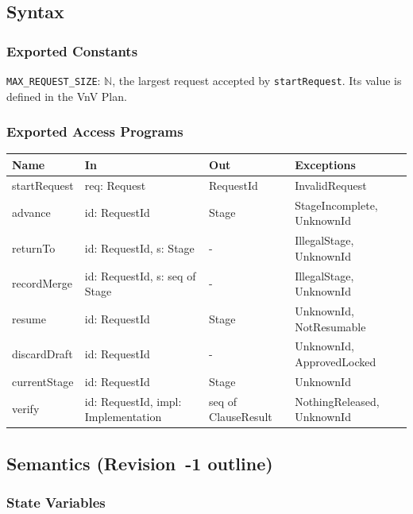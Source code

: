 \documentclass[12pt, titlepage]{article}
\begin{document}
\subsection{Syntax}

\subsubsection{Exported Constants}

\texttt{MAX\_REQUEST\_SIZE}: $\mathbb{N}$, the largest request accepted by
\texttt{startRequest}. Its value is defined in the VnV Plan.

\subsubsection{Exported Access Programs}

\begin{center}
\small
\begin{tabular}{>{\raggedright\arraybackslash}p{3.7cm} >{\raggedright\arraybackslash}p{3.8cm} >{\raggedright\arraybackslash}p{3.6cm} >{\raggedright\arraybackslash}p{3.7cm}}
\hline
\textbf{Name} & \textbf{In} & \textbf{Out} & \textbf{Exceptions} \\
\hline
startRequest & req: Request & RequestId & InvalidRequest \\
advance & id: RequestId & Stage & StageIncomplete, UnknownId \\
returnTo & id: RequestId, s: Stage & - & IllegalStage, UnknownId \\
recordMerge & id: RequestId, s: seq of Stage & - & IllegalStage, UnknownId \\
resume & id: RequestId & Stage & UnknownId, NotResumable \\
discardDraft & id: RequestId & - & UnknownId, ApprovedLocked \\
currentStage & id: RequestId & Stage & UnknownId \\
verify & id: RequestId, impl: Implementation & seq of ClauseResult & NothingReleased, UnknownId \\
\hline
\end{tabular}
\end{center}

\subsection{Semantics (Revision~-1 outline)}

\subsubsection{State Variables}
\end{document}
